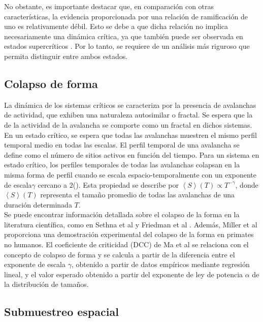 No obstante, es importante destacar que, en comparación con otras características, la evidencia proporcionada por una relación de ramificación de uno es relativamente débil. Esto se debe a que dicha relación no implica necesariamente una dinámica crítica, ya que también puede ser observada en estados supercríticos \cite{hesse_self-organized_2014}. Por lo tanto, se requiere de un análisis más riguroso que permita distinguir entre ambos estados.


\subsection{Colapso de forma}


La dinámica de los sistemas críticos se caracteriza por la presencia de avalanchas de actividad, que exhiben una naturaleza autosimilar o fractal. Se espera que la  de la actividad de la avalancha se comporte como un fractal en dichos sistemas. En un estado crítico, se espera que todas las avalanchas muestren el mismo perfil temporal medio en todas las escalas. El perfil temporal de una avalancha se define como el número de sitios activos en función del tiempo. Para un sistema en estado crítico, los perfiles temporales de todas las avalanchas colapsan en la misma forma de perfil cuando se escala espacio-temporalmente con un exponente de escala$\gamma$ cercano a $2$(). Esta propiedad se describe por  $ \left\langle S\right\rangle(T) \propto T^{-\gamma}$, donde $\left\langle S\right\rangle(T)$  representa el tamaño promedio de todas las avalanchas de una duración determinada $T$.\\

Se puede encontrar información detallada sobre el colapso de la forma en la literatura científica, como en Sethna et al \cite{sethna_crackling_2001} y Friedman et al \cite{friedman_universal_2012}. Además, Miller et al \cite{miller_scale-invariant_2019} proporciona una demostración experimental del colapso de la forma en primates no humanos. El coeficiente de criticidad (DCC) de Ma et al \cite{ma_cortical_2019} se relaciona con el concepto de colapso de forma y se calcula a partir de la diferencia entre el exponente de escala $\gamma$, obtenido a partir de datos empíricos mediante regresión lineal, y el valor esperado obtenido a partir del exponente de ley de potencia $\alpha$ de la distribución de tamaños.


\subsection{Submuestreo espacial}

